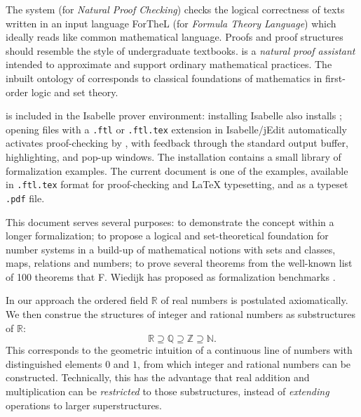 \documentclass{article}
\begin{document}
The \Naproche{} system (for \emph{Natural Proof Checking})
checks the logical correctness of texts
written in an input language ForTheL (for \emph{Formula Theory Language})
which ideally reads like common mathematical language. Proofs and proof 
structures should resemble the
style of undergraduate textbooks. 
\Naproche{} is a \emph{natural proof assistant} intended to
approximate and support ordinary mathematical practices.
The inbuilt ontology of \Naproche{} corresponds to classical foundations
of mathematics in first-order logic and set theory.

\Naproche{} is included in the Isabelle prover environment: installing Isabelle
also installs \Naproche{}; opening files with a \verb+.ftl+ or \verb+.ftl.tex+
extension in Isabelle/jEdit automatically activates proof-checking by \Naproche{},
with feedback through the standard output buffer, highlighting, and
pop-up windows. The \Naproche{} installation contains a small library of
formalization examples. The current document is one of the examples, available
in \verb+.ftl.tex+ format for proof-checking and \LaTeX{} typesetting, and
as a typeset \verb+.pdf+ file.

This document serves several purposes: to demonstrate the 
\Naproche{} concept  within a longer formalization;
to propose a logical and set-theoretical foundation for
number systems in a build-up of mathematical notions
with sets and classes, maps, relations and numbers;
to prove several theorems from the well-known list of 100 theorems
that F. Wiedijk has proposed as formalization benchmarks \cite{Wiedijk}.
 
In our approach the ordered field $\mathbb{R}$ of real numbers
is postulated axiomatically. We then construe the structures of integer and
rational numbers as substructures of $\mathbb{R}$:
\[ \mathbb{R} \supseteq \mathbb{Q} \supseteq \mathbb{Z}
\supseteq \mathbb{N}. \]
This corresponds to the 
geometric intuition of a continuous line of numbers with
distinguished elements $0$ and $1$, from which integer and rational numbers can
be constructed. Technically, this has the advantage 
that real addition and multiplication
can be {\em restricted} to those substructures, instead of {\em extending} operations
to larger superstructures.
\end{document}
